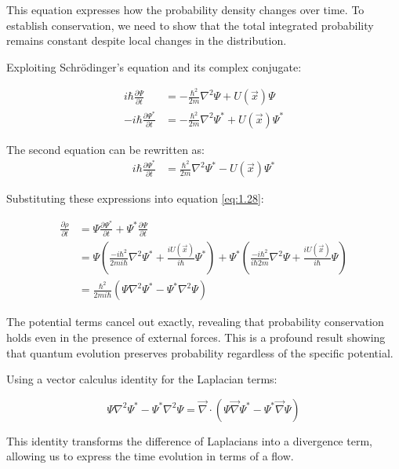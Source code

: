 \documentclass[italian]{HKNdocument}
\begin{document}
This equation expresses how the probability density changes over time. To establish conservation, we need to show that the total integrated probability remains constant despite local changes in the distribution.


Exploiting Schrödinger's equation and its complex conjugate:

\begin{align}
i \hbar \frac{\partial \Psi}{\partial t} &= -\frac{\hbar^{2}}{2 m} \nabla^{2} \Psi+U(\vec{x}) \Psi \\
-i \hbar \frac{\partial \Psi^{*}}{\partial t} &= -\frac{\hbar^{2}}{2 m} \nabla^{2} \Psi^{*}+U(\vec{x}) \Psi^{*}
\end{align}

The second equation can be rewritten as:
\begin{align}
i \hbar \frac{\partial \Psi^{*}}{\partial t} &= \frac{\hbar^{2}}{2 m} \nabla^{2} \Psi^{*}-U(\vec{x}) \Psi^{*}
\end{align}

Substituting these expressions into equation \eqref{eq:1.28}:

\begin{align}
\frac{\partial \rho}{\partial t} &= \Psi \frac{\partial \Psi^{*}}{\partial t}+\Psi^{*} \frac{\partial \Psi}{\partial t} \\
&= \Psi\left(\frac{-i\hbar^{2}}{2m i\hbar} \nabla^{2} \Psi^{*}+\frac{iU(\vec{x})}{i\hbar} \Psi^{*}\right)+\Psi^{*}\left(\frac{-i\hbar^{2}}{i\hbar 2 m} \nabla^{2} \Psi+\frac{iU(\vec{x})}{i\hbar} \Psi\right) \\
&= \frac{\hbar^{2}}{2m i\hbar}\left(\Psi \nabla^{2} \Psi^{*}-\Psi^{*} \nabla^{2} \Psi\right)
\end{align}

The potential terms cancel out exactly, revealing that probability conservation holds even in the presence of external forces. This is a profound result showing that quantum evolution preserves probability regardless of the specific potential.

Using a vector calculus identity for the Laplacian terms:

\begin{equation}
\Psi \nabla^{2} \Psi^{*}-\Psi^{*} \nabla^{2} \Psi=\vec{\nabla} \cdot\left(\Psi \vec{\nabla} \Psi^{*}-\Psi^{*} \vec{\nabla} \Psi\right)
\end{equation}

This identity transforms the difference of Laplacians into a divergence term, allowing us to express the time evolution in terms of a flow.
\end{document}
